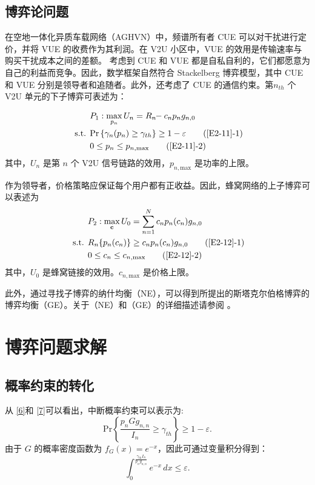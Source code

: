 \subsection{博弈论问题}\label{section2-2-1}
在空地一体化异质车载网络（AGHVN）中，频谱所有者 CUE 可以对干扰进行定价，并将 VUE 的收费作为其利润。在 V2U 小区中，VUE 的效用是传输速率与购买干扰成本之间的差额。
考虑到 CUE 和 VUE 都是自私自利的，它们都愿意为自己的利益而竞争。因此，数学框架自然符合 Stackelberg 博弈模型，其中 CUE 和 VUE 分别是领导者和追随者。此外，还考虑了
 CUE 的通信约束。第$n_{th}$ 个V2U 单元的下子博弈可表述为：

\begin{align}
&P_1: \max\limits_{p_{n}} U_{n}=R_{n}\!\!-c_{n} p_n g_{n,0}                \label{E2-11}\\
\text { s.t. }
& \textrm{Pr}\left\{\gamma_{n}(p_n) \geq \gamma_{th}\right\}\geq1-\varepsilon           \tag{\ref{E2-11}{-1}}      \label{E2-11-1}\\  %
& 0\leq p_n\leq p_{n,\textrm{max}}                           \tag{\ref{E2-11}{-2}}      \label{E2-11-2}  %
\end{align}
其中，$U_{n}$ 是第 $n$ 个 V2U 信号链路的效用，$p_{n,\textrm{max}}$ 是功率的上限。

作为领导者，价格策略应保证每个用户都有正收益。因此，蜂窝网络的上子博弈可以表述为
\begin{align}
&P_2: \max\limits_{\mathbf{c}} U_0=\sum\limits_{n=1}^N c_{n} p_n(c_{n}) g_{n,0}                \label{E2-12}\\
\text { s.t. }
& R_{n}\{p_n(c_{n})\} \geq c_{n} p_n(c_{n}) g_{n,0}           \tag{\ref{E2-12}{-1}}      \label{E2-12-1}\\  %
& 0\leq c_n\leq c_{n,\textrm{max}}                           \tag{\ref{E2-12}{-2}}      \label{E2-12-2}  %
\end{align}
其中，$U_{0}$ 是蜂窝链接的效用。$c_{n,\textrm{max}}$ 是价格上限。

此外，通过寻找子博弈的纳什均衡（NE），可以得到所提出的斯塔克尔伯格博弈的博弈均衡（GE）。关于（NE）和（GE）的详细描述请参阅 \cite{RAI}。
\section{博弈问题求解}\label{section2-3}
\subsection{概率约束的转化}\label{section2-3-1}
从 \eqref{6}和 \eqref{7}可以看出，中断概率约束可以表示为:
\begin{equation}\label{E13}
\textrm{Pr}\left\{\frac{p_{n}G g_{n,n}}{I_n} \geq \gamma_{th}\right\}\geq1-\varepsilon.
\end{equation}
由于 $G$ 的概率密度函数为 $f_G (x)=e^{-x}$，因此可通过变量积分得到：
\begin{equation}\label{E14}
\int_{0}^{\frac{\gamma_{th}I_{n}}{p_n g_{n,n}}} e^{-x}\, dx\leq\varepsilon.
\end{equation}

